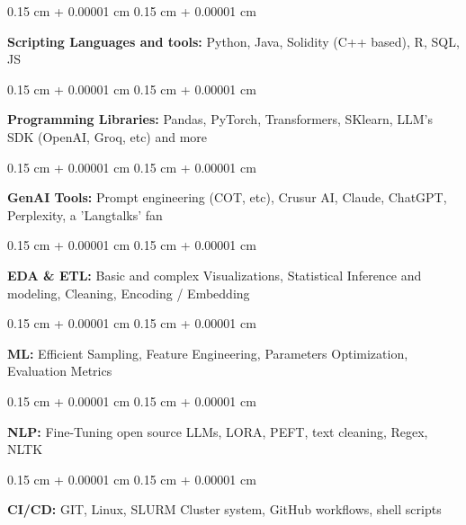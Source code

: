 \documentclass[10pt, letterpaper]{article}
\newenvironment{onecolentry}{
    \begin{adjustwidth}{
        0.15 cm + 0.00001 cm
    }{
        0.15 cm + 0.00001 cm
    }
}{
    \end{adjustwidth}
} %
\begin{document}
        
        \begin{onecolentry}
            \textbf{Scripting Languages and tools:} Python, Java, Solidity (C++ based), R, SQL, JS
        \end{onecolentry}

        \vspace{0.15 cm}

        \begin{onecolentry}
            \textbf{Programming Libraries:} Pandas, PyTorch, Transformers, SKlearn, LLM's SDK (OpenAI, Groq, etc) and more
        \end{onecolentry}

        \vspace{0.15 cm}

        \begin{onecolentry}
            \textbf{GenAI Tools:} Prompt engineering (COT, etc), Crusur AI, Claude, ChatGPT, Perplexity, a 'Langtalks' fan
        \end{onecolentry}

        \vspace{0.15 cm}

        \begin{onecolentry}
            \textbf{EDA \& ETL:} Basic and complex Visualizations, Statistical Inference and modeling, Cleaning, Encoding / Embedding
        \end{onecolentry}

        \vspace{0.15 cm}

        \begin{onecolentry}
            \textbf{ML:} Efficient Sampling, Feature Engineering, Parameters Optimization, Evaluation Metrics
        \end{onecolentry}

        \vspace{0.15 cm}

        \begin{onecolentry}
            \textbf{NLP:} Fine-Tuning open source LLMs, LORA, PEFT, text cleaning, Regex, NLTK
        \end{onecolentry}

        \vspace{0.15 cm}

        \begin{onecolentry}
            \textbf{CI/CD:} GIT, Linux, SLURM Cluster system, GitHub workflows, shell scripts
        \end{onecolentry}
\end{document}
